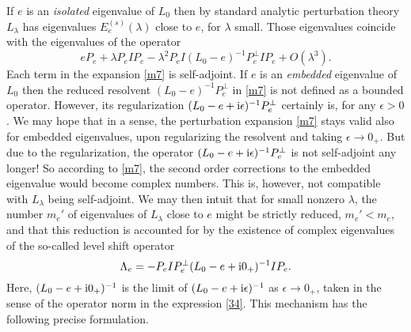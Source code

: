 \documentclass[letterpaper,onecolumn,11pt,accepted=2021-12-09]{quantumarticle}
\numberwithin{equation}{section}
\renewcommand{\i}{{\rm i}}
\begin{document}
If $e$ is an {\em isolated} eigenvalue of  $L_0$ then by standard analytic perturbation theory \cite{Kato} $L_\lambda$ has eigenvalues $E^{(s)}_e(\lambda)$ close to $e$, for $\lambda$ small. Those eigenvalues coincide with the eigenvalues of the operator
\begin{equation}
e P_e  +\lambda P_eIP_e -\lambda^2 P_e I (L_0-e)^{-1}P^\perp_eIP_e +O(\lambda^3).
\label{m7}
\end{equation}
Each term in the expansion \eqref{m7} is self-adjoint. If $e$ is an {\em embedded} eigenvalue of $L_0$ then the reduced resolvent $(L_0-e)^{-1} P^\perp_e$ in \eqref{m7} is not defined as a bounded operator. However, its regularization  $(L_0-e+\i \epsilon)^{-1}P^\perp_e$ certainly is, for any $\epsilon>0$. We may hope that in a sense, the perturbation expansion \eqref{m7} stays valid also for embedded eigenvalues, upon regularizing the resolvent and taking $\epsilon\rightarrow 0_+$. But due to the regularization, the operator $(L_0-e+\i \epsilon)^{-1}P^\perp_e$ is not self-adjoint any longer! So according to \eqref{m7}, the second order corrections to the embedded eigenvalue would become complex numbers. This is, however, not compatible with $L_\lambda$ being self-adjoint. We may then intuit that for small nonzero $\lambda$, the number $m_e'$ of eigenvalues of $L_\lambda$ close to $e$ might be strictly reduced, $m_e' <  m_e$, and that this reduction is accounted for by the existence of complex eigenvalues of the so-called level shift operator
\begin{equation}
\label{34}
\Lambda_e=-P_e I P^\perp _e(L_0-e+\i 0_+)^{-1} IP_e.
\end{equation}
Here, $(L_0-e+\i 0_+)^{-1}$ is the limit of $(L_0-e+\i\epsilon)^{-1}$ as $\epsilon\rightarrow 0_+$, taken in the sense of the operator norm in the expression \eqref{34}. This mechanism has the following precise formulation. 
\end{document}
